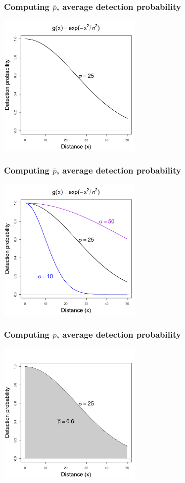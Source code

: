 \documentclass[color=usenames,dvipsnames]{beamer}\usepackage[]{graphicx}\usepackage[]{color}
\begin{document}
\begin{frame}
  \frametitle{Computing $\bar{p}$, average detection probability}
\begin{center}
  \includegraphics[width=7cm]{figs/detfun1}
\end{center}
\end{frame}




\begin{frame}
  \frametitle{Computing $\bar{p}$, average detection probability}
\begin{center}
  \includegraphics[width=7cm]{figs/detfun2}
\end{center}
\end{frame}



\begin{frame}
  \frametitle{Computing $\bar{p}$, average detection probability}
\begin{center}
  \includegraphics[width=7cm]{figs/detfun3}
\end{center}
\end{frame}
\end{document}
